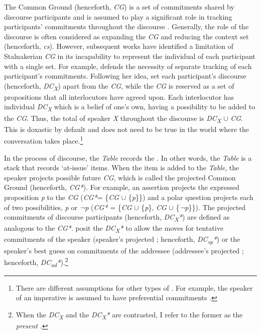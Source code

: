 \documentclass[output=paper,colorlinks,citecolor=brown]{langscibook}
\begin{document}
The Common Ground (henceforth, \textit{CG}) is a set of commitments shared by discourse participants and is assumed to play a significant role in tracking participants’ commitments throughout the discourse \citep{stalnaker1978assertion}. Generally, the role of the discourse is often considered as expanding the \textit{CG} and reducing the context set (henceforth, \textit{cs}). However, subsequent works have identified a limitation of Stalnakerian \textit{CG} in its incapability to represent the individual  of each participant with a single set. For example, \citet{gunlogson2003true} defends the necessity of separate tracking of each participant’s commitments. Following her idea, \citet{farkas2010reacting} set each participant’s discourse  (henceforth, \textit{DC\textsubscript{X}}) apart from the \textit{CG}, while the \textit{CG} is reserved as a set of propositions that all interlocutors have agreed upon. Each interlocutor has individual \textit{DC\textsubscript{X}} which is a belief of one’s own, having a possibility to be added to the \textit{CG}. Thus, the total  of speaker \textit{X} throughout the discourse is \textit{DC\textsubscript{X}} $\cup$ \textit{CG}. This  is doxastic by default and does not need to be true in the world where the conversation takes place.\footnote{
There are different assumptions for other types of . For example, the speaker of an imperative is assumed to have preferential commitments \citep{condoravdi2012imperatives, rudin2018risinga, rudin2018rising}.
}

In the process of discourse, the \textit{Table} records the  \citep[henceforth, \textit{QUD};][]{ginzburg1996dynamics, roberts1996information, roberts2012information}. In other words, the \textit{Table} is a stack that records ‘at-issue’ items. When the item is added to the \textit{Table}, the speaker projects possible future \textit{CG}, which is called the projected Common Ground (henceforth, \textit{CG*}). For example, an assertion projects the expressed proposition \textit{p} to the \textit{CG} (\textit{CG*}= \{\textit{CG} $\cup$ \{\textit{p}\}\}) and a polar question projects each of two possibilities, \textit{p} or \textit{¬p} (\textit{CG*} = \{\textit{CG} $\cup$ \{\textit{p}\}, \textit{CG} $\cup$ \{\textit{¬p}\}\}). The projected commitments of discourse participants (henceforth, \textit{DC\textsubscript{X}*}) are defined as analogous to the \textit{CG*}. \citet{malamud2015three} posit the \textit{DC\textsubscript{X}*} to allow the moves for tentative commitments of the speaker (speaker’s projected ; henceforth, \textit{DC\textsubscript{sp}*}) or the speaker’s best guess on commitments of the addressee (addressee’s projected ; henceforth, \textit{DC\textsubscript{ad}*}).\footnote{When the \textit{DC\textsubscript{X}} and the \textit{DC\textsubscript{X}*} are contrasted, I refer to the former as the \textit{present} .}
\end{document}
